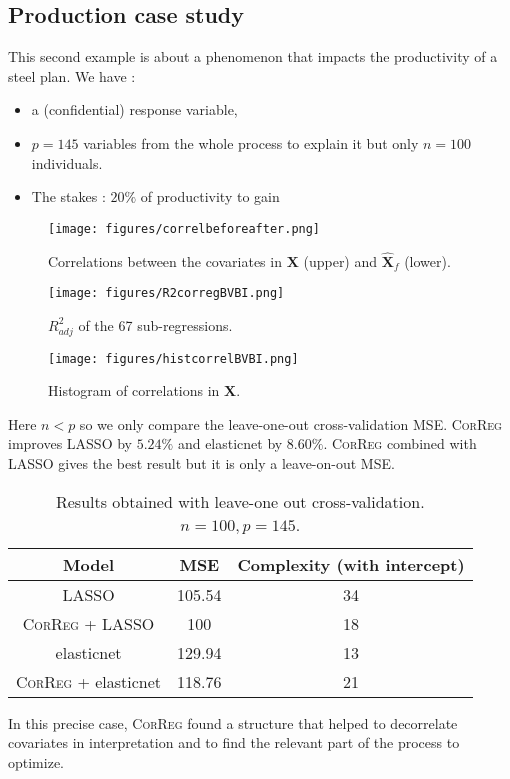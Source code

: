 \documentclass[11pt,a4paper]{article}
\begin{document}
		\subsection{Production case study}
This second example is about a phenomenon that impacts the productivity of a steel plan.
We have :
		\begin{itemize}
			\item a (confidential)  response variable,
			\item $p=145$ variables from the whole process to explain it but only $n=100$ individuals.
			\item The stakes : $20\%$ of productivity to gain
		\end{itemize}
		
\begin{figure}[h!]
	\begin{minipage}[l]{.30\linewidth}
			\texttt{[image: figures/correlbeforeafter.png]} 
			\caption{Correlations between the covariates in $\boldsymbol{X}$ (upper) and $\hat{\boldsymbol{X}}_f$ (lower).}
	\end{minipage} \hfill
	\begin{minipage}[c]{.30\linewidth}
			\texttt{[image: figures/R2corregBVBI.png]} 
			\caption{$R^2_{adj}$ of the 67 sub-regressions.}
	\end{minipage} \hfill
   \begin{minipage}[r]{.30\linewidth}
			\texttt{[image: figures/histcorrelBVBI.png]} 
			\caption{Histogram of correlations in $\boldsymbol{X}$.} 
   \end{minipage}
\end{figure}   			
	Here $n<p$ so we only compare the leave-one-out cross-validation MSE.
	\textsc{CorReg} improves LASSO by $5.24\%$ and elasticnet by $8.60\%$. \textsc{CorReg} combined with LASSO gives the best result but it is only a leave-on-out MSE.
\begin{table}[h!]
\centering
\begin{tabular}{|c|c|c|}
	\hline 
	Model & MSE & Complexity (with intercept) \\ 
	\hline 
	LASSO & 105.54 & 34 \\ 
	\hline 
	\textsc{CorReg} + LASSO & 100 & 18 \\ 
	\hline 
	elasticnet & 129.94 & 13 \\ 
	\hline 
	\textsc{CorReg} + elasticnet & 118.76 & 21 \\ 
	\hline 
\end{tabular} 
\caption{Results obtained with leave-one out cross-validation. $n=100, p=145$.}	
\end{table}
In this precise case, \textsc{CorReg} found a structure that helped to decorrelate covariates in interpretation and to find the relevant part of the process to optimize.
\end{document}
